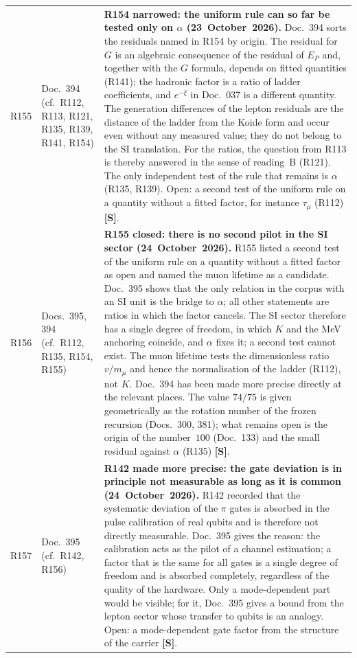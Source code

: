\begin{longtable}{@{}p{0.9cm}p{3.1cm}p{10.2cm}@{}}
R155 & Doc.~394 (cf.\ R112, R113, R121, R135, R139, R141, R154) & \textbf{R154 narrowed: the uniform rule can so far be tested only on $\alpha$ (23~October~2026).} Doc.~394 sorts the residuals named in R154 by origin. The residual for $G$ is an algebraic consequence of the residual of $E_P$ and, together with the $G$ formula, depends on fitted quantities (R141); the hadronic factor is a ratio of ladder coefficients, and $e^{-\xi}$ in Doc.~037 is a different quantity. The generation differences of the lepton residuals are the distance of the ladder from the Koide form and occur even without any measured value; they do not belong to the SI translation. For the ratios, the question from R113 is thereby answered in the sense of reading~B (R121). The only independent test of the rule that remains is $\alpha$ (R135, R139). Open: a second test of the uniform rule on a quantity without a fitted factor, for instance $\tau_\mu$ (R112) \textbf{[S]}. \\
R156 & Docs.~395, 394 (cf.\ R112, R135, R154, R155) & \textbf{R155 closed: there is no second pilot in the SI sector (24~October~2026).} R155 listed a second test of the uniform rule on a quantity without a fitted factor as open and named the muon lifetime as a candidate. Doc.~395 shows that the only relation in the corpus with an SI unit is the bridge to $\alpha$; all other statements are ratios in which the factor cancels. The SI sector therefore has a single degree of freedom, in which $K$ and the MeV anchoring coincide, and $\alpha$ fixes it; a second test cannot exist. The muon lifetime tests the dimensionless ratio $v/m_\mu$ and hence the normalisation of the ladder (R112), not $K$. Doc.~394 has been made more precise directly at the relevant places. The value $74/75$ is given geometrically as the rotation number of the frozen recursion (Docs.~300, 381); what remains open is the origin of the number~$100$ (Doc.~133) and the small residual against $\alpha$ (R135) \textbf{[S]}. \\
R157 & Doc.~395 (cf.\ R142, R156) & \textbf{R142 made more precise: the gate deviation is in principle not measurable as long as it is common (24~October~2026).} R142 recorded that the systematic deviation of the $\pi$ gates is absorbed in the pulse calibration of real qubits and is therefore not directly measurable. Doc.~395 gives the reason: the calibration acts as the pilot of a channel estimation; a factor that is the same for all gates is a single degree of freedom and is absorbed completely, regardless of the quality of the hardware. Only a mode-dependent part would be visible; for it, Doc.~395 gives a bound from the lepton sector whose transfer to qubits is an analogy. Open: a mode-dependent gate factor from the structure of the carrier \textbf{[S]}. \\

\end{longtable}
